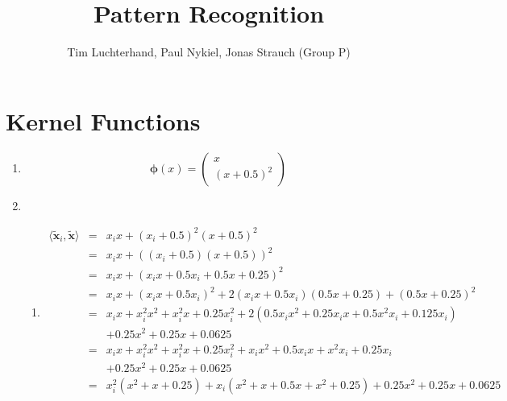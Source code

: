 \documentclass[DIN, pagenumber=false, fontsize=11pt, parskip=half]{scrartcl}
\title{Pattern Recognition}
\author{Tim Luchterhand, Paul Nykiel, Jonas Strauch (Group P)}
\begin{document}
    \maketitle
    \section{Kernel Functions}
    \begin{enumerate}
        \item 
            \begin{equation*}
                \bm{\phi}(x) = \begin{pmatrix} x \\ {(x + 0.5)}^2 \end{pmatrix}
            \end{equation*}
            \setcounter{enumi}{3}
        \item
            \begin{enumerate}[label=\alph*)]
                \item
                    \begin{eqnarray*}
                        \langle \tilde{\mathbf{x}}_i, \tilde{\mathbf{x}}\rangle 
                            &=& x_i x + {(x_i + 0.5)}^2 {(x + 0.5)}^2 \\
                            &=& x_i x + {\left((x_i + 0.5) (x + 0.5)\right)}^2 \\
                            &=& x_i x + {(x_i x + 0.5 x_i + 0.5 x + 0.25)}^2 \\
                            &=& x_i x + {(x_i x + 0.5 x_i)}^2 
                                + 2 (x_i x + 0.5 x_i) (0.5 x + 0.25)
                                + {(0.5 x + 0.25)}^2 \\
                            &=& x_i x + x_i^2 x^2 + x_i^2 x + 0.25 x_i^2
                                + 2 (0.5 x_i x^2 + 0.25 x_i x + 0.5 x^2 x_i + 0.125 x_i) \\
                                && + 0.25 x^2 + 0.25 x + 0.0625 \\
                            &=& x_i x + x_i^2 x^2 + x_i^2 x + 0.25 x_i^2
                                + x_i x^2 + 0.5 x_i x + x^2 x_i + 0.25 x_i \\
                                && + 0.25 x^2 + 0.25 x + 0.0625 \\
                            &=& x_i^2 (x^2 + x + 0.25)
                                + x_i (x^2 + x + 0.5 x + x^2 + 0.25)
                                + 0.25 x^2 + 0.25 x + 0.0625 \\

\end{eqnarray*}
\end{enumerate}
\end{enumerate}
\end{document}
